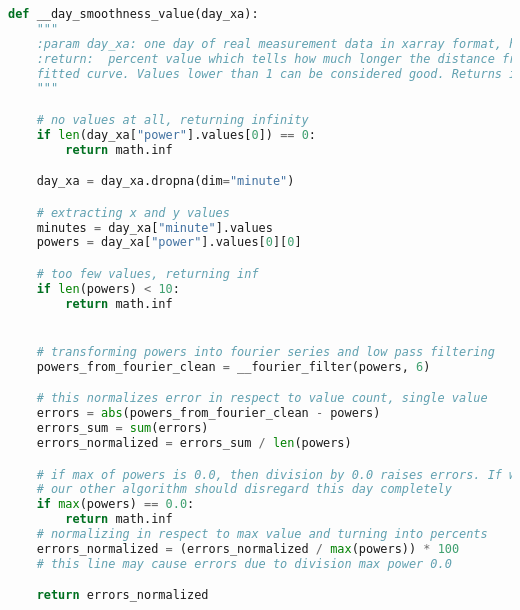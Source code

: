 \begin{lstlisting}[language=Python, caption={Cloud free day day smoothness function}]
def __day_smoothness_value(day_xa):
    """
    :param day_xa: one day of real measurement data in xarray format, has to have fields minute and power
    :return:  percent value which tells how much longer the distance from point to point is compared to sine/cosine
    fitted curve. Values lower than 1 can be considered good. Returns infinity if too few values in day
    """

    # no values at all, returning infinity
    if len(day_xa["power"].values[0]) == 0:
        return math.inf

    day_xa = day_xa.dropna(dim="minute")

    # extracting x and y values
    minutes = day_xa["minute"].values
    powers = day_xa["power"].values[0][0]

    # too few values, returning inf
    if len(powers) < 10:
        return math.inf


    # transforming powers into fourier series and low pass filtering
    powers_from_fourier_clean = __fourier_filter(powers, 6)

    # this normalizes error in respect to value count, single value
    errors = abs(powers_from_fourier_clean - powers)
    errors_sum = sum(errors)
    errors_normalized = errors_sum / len(powers)

    # if max of powers is 0.0, then division by 0.0 raises errors. If we check max for 0.0 and return infinity
    # our other algorithm should disregard this day completely
    if max(powers) == 0.0:
        return math.inf
    # normalizing in respect to max value and turning into percents
    errors_normalized = (errors_normalized / max(powers)) * 100
    # this line may cause errors due to division max power 0.0

    return errors_normalized

\end{lstlisting}

